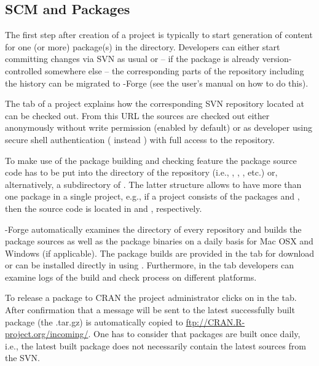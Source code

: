 \subsection{SCM and \R{} Packages}

The first step after creation of a project is typically to start
generation of content for one (or more) \R{} package(s) in the 
directory. Developers can either start committing changes via SVN as usual
or -- if the package is already version-controlled somewhere else --
the corresponding parts of the repository including the history can be
migrated to \R{}-Forge (see the user's manual on how to do this).

The  tab of a project explains how the corresponding SVN
repository located at 
can be checked out. From
this URL the sources are checked out either 
anonymously without write permission (enabled by default) or as
developer using secure shell 
authentication ( instead ) with full
access to the repository.

To make use of the package building and checking feature
the package source code has to be put into the  directory
of the repository (i.e., ,
, , etc.) or, alternatively, a 
subdirectory of . The latter structure allows to
have more than one package in a single project, e.g., if
a project consists of the packages  and , then the
source code is located in  and ,
respectively.

\R{}-Forge automatically examines the  directory of
every repository and builds the package sources as well as the package
binaries on a daily basis for Mac OSX and Windows (if applicable). The
package builds 
are provided in the  tab for download or can be
installed directly in \R{} using 
. Furthermore, in the  tab developers can examine logs of the build and check
process on different platforms. 

To release a package to CRAN the project administrator clicks on
 in the  tab. After
confirmation that a message will be sent to 
the latest successfully built package (the .tar.gz) is automatically
copied to \url{ftp://CRAN.R-project.org/incoming/}. One has to
consider that packages are built once daily, i.e., the latest built
package does not necessarily contain the latest sources from the SVN.

